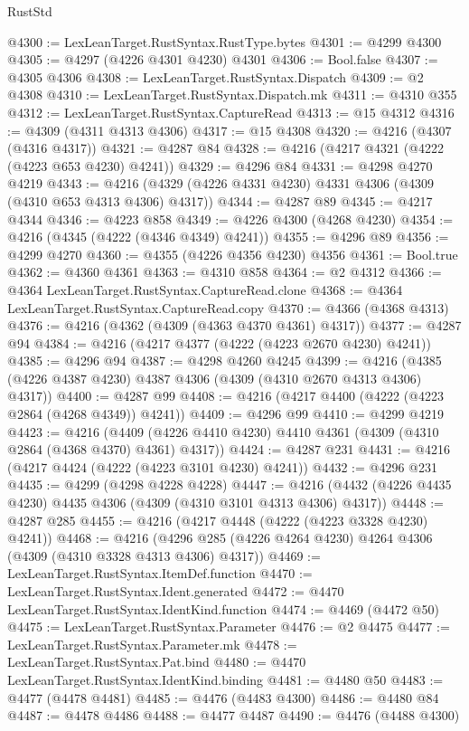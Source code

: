 \begin{lexlean}{RustStd}
\begin{coremodule}
{\begin{coremodule}
{{{{{{{{{{{{{{{{{{{{{{{{{{{{{{{{{{{{{{{{{{{{{{{{{{{{{{{{{{{{@4300 := LexLeanTarget.RustSyntax.RustType.bytes
@4301 := @4299 @4300
@4305 := @4297 (@4226 @4301 @4230) @4301
@4306 := Bool.false
@4307 := @4305 @4306
@4308 := LexLeanTarget.RustSyntax.Dispatch
@4309 := @2 @4308
@4310 := LexLeanTarget.RustSyntax.Dispatch.mk
@4311 := @4310 @355
@4312 := LexLeanTarget.RustSyntax.CaptureRead
@4313 := @15 @4312
@4316 := @4309 (@4311 @4313 @4306)
@4317 := @15 @4308
@4320 := @4216 (@4307 (@4316 @4317))
@4321 := @4287 @84
@4328 := @4216 (@4217 @4321 (@4222 (@4223 @653 @4230) @4241))
@4329 := @4296 @84
@4331 := @4298 @4270 @4219
@4343 := @4216 (@4329 (@4226 @4331 @4230) @4331 @4306 (@4309 (@4310 @653 @4313 @4306) @4317))
@4344 := @4287 @89
@4345 := @4217 @4344
@4346 := @4223 @858
@4349 := @4226 @4300 (@4268 @4230)
@4354 := @4216 (@4345 (@4222 (@4346 @4349) @4241))
@4355 := @4296 @89
@4356 := @4299 @4270
@4360 := @4355 (@4226 @4356 @4230) @4356
@4361 := Bool.true
@4362 := @4360 @4361
@4363 := @4310 @858
@4364 := @2 @4312
@4366 := @4364 LexLeanTarget.RustSyntax.CaptureRead.clone
@4368 := @4364 LexLeanTarget.RustSyntax.CaptureRead.copy
@4370 := @4366 (@4368 @4313)
@4376 := @4216 (@4362 (@4309 (@4363 @4370 @4361) @4317))
@4377 := @4287 @94
@4384 := @4216 (@4217 @4377 (@4222 (@4223 @2670 @4230) @4241))
@4385 := @4296 @94
@4387 := @4298 @4260 @4245
@4399 := @4216 (@4385 (@4226 @4387 @4230) @4387 @4306 (@4309 (@4310 @2670 @4313 @4306) @4317))
@4400 := @4287 @99
@4408 := @4216 (@4217 @4400 (@4222 (@4223 @2864 (@4268 @4349)) @4241))
@4409 := @4296 @99
@4410 := @4299 @4219
@4423 := @4216
    (@4409 (@4226 @4410 @4230) @4410 @4361 (@4309 (@4310 @2864 (@4368 @4370) @4361) @4317))
@4424 := @4287 @231
@4431 := @4216 (@4217 @4424 (@4222 (@4223 @3101 @4230) @4241))
@4432 := @4296 @231
@4435 := @4299 (@4298 @4228 @4228)
@4447 := @4216 (@4432 (@4226 @4435 @4230) @4435 @4306 (@4309 (@4310 @3101 @4313 @4306) @4317))
@4448 := @4287 @285
@4455 := @4216 (@4217 @4448 (@4222 (@4223 @3328 @4230) @4241))
@4468 := @4216 (@4296 @285 (@4226 @4264 @4230) @4264 @4306 (@4309 (@4310 @3328 @4313 @4306) @4317))
@4469 := LexLeanTarget.RustSyntax.ItemDef.function
@4470 := LexLeanTarget.RustSyntax.Ident.generated
@4472 := @4470 LexLeanTarget.RustSyntax.IdentKind.function
@4474 := @4469 (@4472 @50)
@4475 := LexLeanTarget.RustSyntax.Parameter
@4476 := @2 @4475
@4477 := LexLeanTarget.RustSyntax.Parameter.mk
@4478 := LexLeanTarget.RustSyntax.Pat.bind
@4480 := @4470 LexLeanTarget.RustSyntax.IdentKind.binding
@4481 := @4480 @50
@4483 := @4477 (@4478 @4481)
@4485 := @4476 (@4483 @4300)
@4486 := @4480 @84
@4487 := @4478 @4486
@4488 := @4477 @4487
@4490 := @4476 (@4488 @4300)
}}}}}}}}}}}}}}}}}}}}}}}}}}}}}}}}}}}}}}}}}}}}}}}}}}}}}}}}}}}}
\end{coremodule}}
\end{coremodule}
\end{lexlean}
